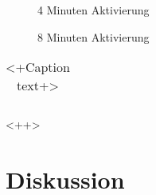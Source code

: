\documentclass[12pt,a4paper,titlepage,headinclude,bibtotoc]{scrartcl}
\begin{document}
\begin{figure}[h]
\centering

\caption{4 Minuten Aktivierung}
\label{fig:4min}
\end{figure}

\begin{figure}[h]
\centering

\caption{8 Minuten Aktivierung}
\label{fig:8min}
\end{figure}


\begin{table}
\centering
\begin{tabular}{|c|c|c|}
\hline


\end{tabular}
\caption{<+Caption text+>}
\label{tab:<+label+>}
\end{table}<++>

\section{Diskussion}
\label{sec:diskussion}



\end{document}
